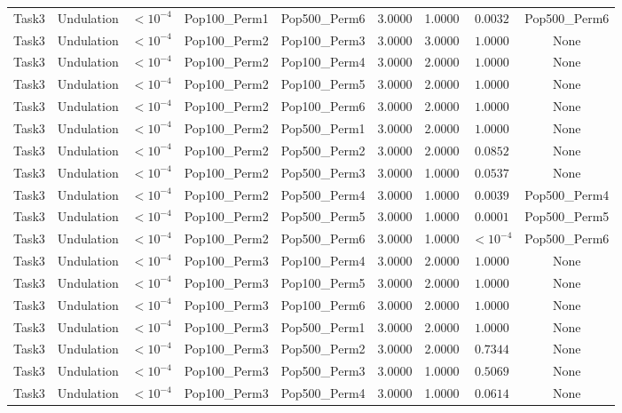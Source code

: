 \documentclass[8pt]{article}
\begin{document}
\begin{longtable}{llccccccc}
Task3 & Undulation & $< 10^{-4}$ & Pop100\_Perm1 & Pop500\_Perm6 & 3.0000 & 1.0000 & $0.0032$ & Pop500\_Perm6 \\
Task3 & Undulation & $< 10^{-4}$ & Pop100\_Perm2 & Pop100\_Perm3 & 3.0000 & 3.0000 & $1.0000$ & None \\
Task3 & Undulation & $< 10^{-4}$ & Pop100\_Perm2 & Pop100\_Perm4 & 3.0000 & 2.0000 & $1.0000$ & None \\
Task3 & Undulation & $< 10^{-4}$ & Pop100\_Perm2 & Pop100\_Perm5 & 3.0000 & 2.0000 & $1.0000$ & None \\
Task3 & Undulation & $< 10^{-4}$ & Pop100\_Perm2 & Pop100\_Perm6 & 3.0000 & 2.0000 & $1.0000$ & None \\
Task3 & Undulation & $< 10^{-4}$ & Pop100\_Perm2 & Pop500\_Perm1 & 3.0000 & 2.0000 & $1.0000$ & None \\
Task3 & Undulation & $< 10^{-4}$ & Pop100\_Perm2 & Pop500\_Perm2 & 3.0000 & 2.0000 & $0.0852$ & None \\
Task3 & Undulation & $< 10^{-4}$ & Pop100\_Perm2 & Pop500\_Perm3 & 3.0000 & 1.0000 & $0.0537$ & None \\
Task3 & Undulation & $< 10^{-4}$ & Pop100\_Perm2 & Pop500\_Perm4 & 3.0000 & 1.0000 & $0.0039$ & Pop500\_Perm4 \\
Task3 & Undulation & $< 10^{-4}$ & Pop100\_Perm2 & Pop500\_Perm5 & 3.0000 & 1.0000 & $0.0001$ & Pop500\_Perm5 \\
Task3 & Undulation & $< 10^{-4}$ & Pop100\_Perm2 & Pop500\_Perm6 & 3.0000 & 1.0000 & $< 10^{-4}$ & Pop500\_Perm6 \\
Task3 & Undulation & $< 10^{-4}$ & Pop100\_Perm3 & Pop100\_Perm4 & 3.0000 & 2.0000 & $1.0000$ & None \\
Task3 & Undulation & $< 10^{-4}$ & Pop100\_Perm3 & Pop100\_Perm5 & 3.0000 & 2.0000 & $1.0000$ & None \\
Task3 & Undulation & $< 10^{-4}$ & Pop100\_Perm3 & Pop100\_Perm6 & 3.0000 & 2.0000 & $1.0000$ & None \\
Task3 & Undulation & $< 10^{-4}$ & Pop100\_Perm3 & Pop500\_Perm1 & 3.0000 & 2.0000 & $1.0000$ & None \\
Task3 & Undulation & $< 10^{-4}$ & Pop100\_Perm3 & Pop500\_Perm2 & 3.0000 & 2.0000 & $0.7344$ & None \\
Task3 & Undulation & $< 10^{-4}$ & Pop100\_Perm3 & Pop500\_Perm3 & 3.0000 & 1.0000 & $0.5069$ & None \\
Task3 & Undulation & $< 10^{-4}$ & Pop100\_Perm3 & Pop500\_Perm4 & 3.0000 & 1.0000 & $0.0614$ & None \\

\end{longtable}
\end{document}
